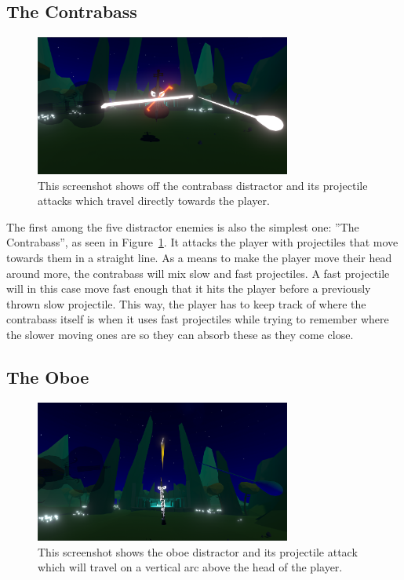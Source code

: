 \subsection{The Contrabass}
\begin{figure}[tbph]
    \centering
    \includegraphics[width=0.75\textwidth]{figures/screenshots/contrabass.png}
    \caption[The Contrabass Distractor]{This screenshot shows off the contrabass distractor and its projectile attacks which travel directly towards the player.}
    \label{fig:contrabassDistractor}
\end{figure}
The first among the five distractor enemies is also the simplest one: ''The Contrabass'', as seen in Figure~\ref{fig:contrabassDistractor}. It attacks the player with projectiles that move towards them in a straight line. As a means to make the player move their head around more, the contrabass will mix slow and fast projectiles. A fast projectile will in this case move fast enough that it hits the player before a previously thrown slow projectile. This way, the player has to keep track of where the contrabass itself is when it uses fast projectiles while trying to remember where the slower moving ones are so they can absorb these as they come close. 
 
\subsection{The Oboe}
\begin{figure}[tbph]
    \centering
    \includegraphics[width=0.75\textwidth]{figures/screenshots/oboe.png}
    \caption[The Oboe Distractor]{This screenshot shows the oboe distractor and its projectile attack which will travel on a vertical arc above the head of the player.}
    \label{fig:oboeDistractor}
\end{figure}

